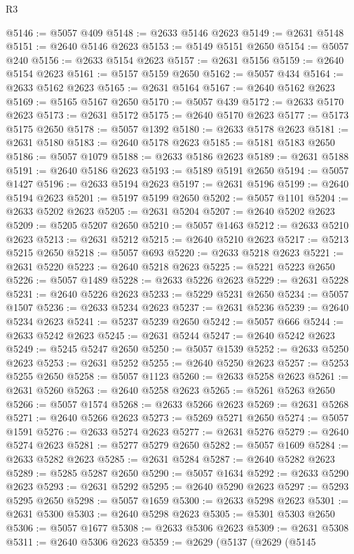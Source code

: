 \begin{lexlean}{R3}
\begin{coremodule}
@5146 := @5057 @409
@5148 := @2633 @5146 @2623
@5149 := @2631 @5148
@5151 := @2640 @5146 @2623
@5153 := @5149 @5151 @2650
@5154 := @5057 @240
@5156 := @2633 @5154 @2623
@5157 := @2631 @5156
@5159 := @2640 @5154 @2623
@5161 := @5157 @5159 @2650
@5162 := @5057 @434
@5164 := @2633 @5162 @2623
@5165 := @2631 @5164
@5167 := @2640 @5162 @2623
@5169 := @5165 @5167 @2650
@5170 := @5057 @439
@5172 := @2633 @5170 @2623
@5173 := @2631 @5172
@5175 := @2640 @5170 @2623
@5177 := @5173 @5175 @2650
@5178 := @5057 @1392
@5180 := @2633 @5178 @2623
@5181 := @2631 @5180
@5183 := @2640 @5178 @2623
@5185 := @5181 @5183 @2650
@5186 := @5057 @1079
@5188 := @2633 @5186 @2623
@5189 := @2631 @5188
@5191 := @2640 @5186 @2623
@5193 := @5189 @5191 @2650
@5194 := @5057 @1427
@5196 := @2633 @5194 @2623
@5197 := @2631 @5196
@5199 := @2640 @5194 @2623
@5201 := @5197 @5199 @2650
@5202 := @5057 @1101
@5204 := @2633 @5202 @2623
@5205 := @2631 @5204
@5207 := @2640 @5202 @2623
@5209 := @5205 @5207 @2650
@5210 := @5057 @1463
@5212 := @2633 @5210 @2623
@5213 := @2631 @5212
@5215 := @2640 @5210 @2623
@5217 := @5213 @5215 @2650
@5218 := @5057 @693
@5220 := @2633 @5218 @2623
@5221 := @2631 @5220
@5223 := @2640 @5218 @2623
@5225 := @5221 @5223 @2650
@5226 := @5057 @1489
@5228 := @2633 @5226 @2623
@5229 := @2631 @5228
@5231 := @2640 @5226 @2623
@5233 := @5229 @5231 @2650
@5234 := @5057 @1507
@5236 := @2633 @5234 @2623
@5237 := @2631 @5236
@5239 := @2640 @5234 @2623
@5241 := @5237 @5239 @2650
@5242 := @5057 @666
@5244 := @2633 @5242 @2623
@5245 := @2631 @5244
@5247 := @2640 @5242 @2623
@5249 := @5245 @5247 @2650
@5250 := @5057 @1539
@5252 := @2633 @5250 @2623
@5253 := @2631 @5252
@5255 := @2640 @5250 @2623
@5257 := @5253 @5255 @2650
@5258 := @5057 @1123
@5260 := @2633 @5258 @2623
@5261 := @2631 @5260
@5263 := @2640 @5258 @2623
@5265 := @5261 @5263 @2650
@5266 := @5057 @1574
@5268 := @2633 @5266 @2623
@5269 := @2631 @5268
@5271 := @2640 @5266 @2623
@5273 := @5269 @5271 @2650
@5274 := @5057 @1591
@5276 := @2633 @5274 @2623
@5277 := @2631 @5276
@5279 := @2640 @5274 @2623
@5281 := @5277 @5279 @2650
@5282 := @5057 @1609
@5284 := @2633 @5282 @2623
@5285 := @2631 @5284
@5287 := @2640 @5282 @2623
@5289 := @5285 @5287 @2650
@5290 := @5057 @1634
@5292 := @2633 @5290 @2623
@5293 := @2631 @5292
@5295 := @2640 @5290 @2623
@5297 := @5293 @5295 @2650
@5298 := @5057 @1659
@5300 := @2633 @5298 @2623
@5301 := @2631 @5300
@5303 := @2640 @5298 @2623
@5305 := @5301 @5303 @2650
@5306 := @5057 @1677
@5308 := @2633 @5306 @2623
@5309 := @2631 @5308
@5311 := @2640 @5306 @2623
@5359 := @2629
    (@5137
      (@2629
        (@5145

\end{coremodule}
\end{lexlean}
